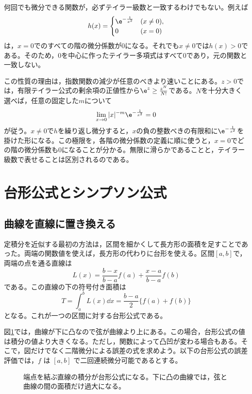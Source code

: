 \begin{note}
何回でも微分できる関数が，必ずテイラー級数と一致するわけでもない。例えば
\[
 h(x)=
 \begin{cases}
  \e^{-\frac1{x^2}}&(x\ne0),\\
  0&(x=0)
 \end{cases}
\]
は，$x=0$でのすべての階の微分係数が$0$になる。それでも$x\ne0$では$h(x)>0$である。そのため，$0$を中心に作ったテイラー多項式はすべて$0$であり，元の関数と一致しない。

この性質の理由は，指数関数の減少が任意のべきより速いことにある。$z>0$では，有限テイラー公式の剰余項の正値性から$\e^z\geq\frac{z^N}{N!}$である。$N$を十分大きく選べば，任意の固定した$m$について
\[
 \lim_{x\to0}|x|^{-m}\e^{-\frac1{x^2}}=0
\]
が従う。$x\ne0$で$h$を繰り返し微分すると，$x$の負の整数べきの有限和に$\e^{-\frac1{x^2}}$を掛けた形になる。この極限を，各階の微分係数の定義に順に使うと，$x=0$でどの階の微分係数も$0$になることが分かる。無限に滑らかであることと，テイラー級数で表せることは区別されるのである。
\end{note}

\section{台形公式とシンプソン公式}\label{節:数値積分}

\subsection{曲線を直線に置き換える}

定積分を近似する最初の方法は，区間を細かくして長方形の面積を足すことであった。両端の関数値を使えば，長方形の代わりに台形を使える。区間$[a,b]$で，両端の点を通る直線は
\[
 L(x)=\frac{b-x}{b-a}f(a)+\frac{x-a}{b-a}f(b)
\]
である。この直線の下の符号付き面積は
\[
 T=\int_a^bL(x)\dd x=\frac{b-a}{2}\{f(a)+f(b)\}
\]
となる。これが一つの区間に対する台形公式である。

図\ref{図:台形近似}では，曲線が下に凸なので弦が曲線より上にある。この場合，台形公式の値は積分の値より大きくなる。ただし，関数によって凸凹が変わる場合もある。そこで，図だけでなく二階微分による誤差の式を求めよう。以下の台形公式の誤差評価では，$f$ は $[a,b]$ で二回連続微分可能であるとする。

\begin{figure}[htbp]
\centering
{}
\caption{端点を結ぶ直線の積分が台形公式になる。下に凸の曲線では，弦と曲線の間の面積だけ過大になる。}
\label{図:台形近似}
\end{figure}

